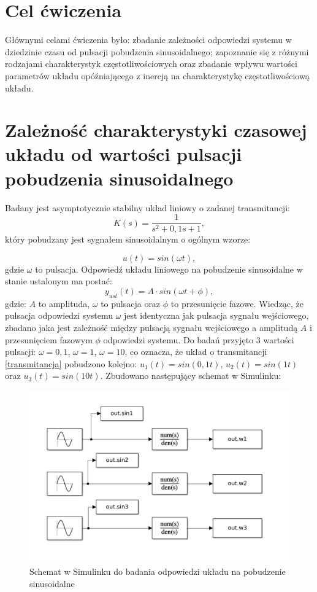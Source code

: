 \documentclass[12pt]{article}
\begin{document}

\tableofcontents
\newpage

\section{Cel ćwiczenia}
Głównymi celami ćwiczenia było: zbadanie zależności odpowiedzi systemu w dziedzinie czasu od pulsacji pobudzenia sinusoidalnego; zapoznanie się z różnymi rodzajami charakterystyk częstotliwościowych oraz zbadanie wpływu wartości parametrów układu opóźniającego z inercją na charakterystykę częstotliwościową układu.


\section{Zależność charakterystyki czasowej układu od wartości pulsacji pobudzenia sinusoidalnego}
Badany jest asymptotycznie stabilny układ liniowy o zadanej transmitancji:
\begin{equation}
    K(s) = \frac{1}{s^2+0,1s+1},
    \label{transmitancja}
\end{equation}
który pobudzany jest sygnałem sinusoidalnym o ogólnym wzorze:

\begin{equation}
    u(t) = sin(\omega t),
\end{equation}
gdzie $\omega$ to pulsacja. Odpowiedź układu liniowego na pobudzenie sinusoidalne w stanie ustalonym ma postać:
\begin{equation}
    y_{ust}(t) = A \cdot sin(\omega t + \phi),
\end{equation}
gdzie: $A$ to amplituda, $\omega$ to pulsacja oraz $\phi$ to przesunięcie fazowe. Wiedząc, że pulsacja odpowiedzi systemu $\omega$ jest identyczna jak pulsacja sygnału wejściowego, zbadano jaka jest zależność między pulsacją sygnału wejściowego a amplitudą $A$ i przesunięciem fazowym $\phi$ odpowiedzi systemu. Do badań przyjęto 3 wartości pulsacji: $\omega = 0,1$, $\omega = 1$, $\omega = 10$, co oznacza, że układ o transmitancji \ref{transmitancja} pobudzono kolejno: $u_1(t) = sin(0,1t)$, $u_2(t) = sin(1t)$ oraz $u_3(t) = sin(10t)$.  Zbudowano następujący schemat w Simulinku:
\begin{figure}[H]
    \centering
    \includegraphics[scale=0.25]{2.png}
    \caption{Schemat w Simulinku do badania odpowiedzi układu na pobudzenie sinusoidalne}
\end{figure}
\end{document}
